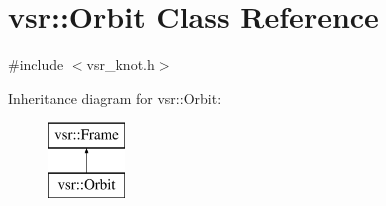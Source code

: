 \hypertarget{classvsr_1_1_orbit}{\section{vsr\-:\-:Orbit Class Reference}
\label{classvsr_1_1_orbit}
}


{\ttfamily \#include $<$vsr\-\_\-knot.\-h$>$}

Inheritance diagram for vsr\-:\-:Orbit\-:\begin{figure}[H]
\begin{center}
\leavevmode
\includegraphics[height=2.000000cm]{classvsr_1_1_orbit}
\end{center}
\end{figure}

